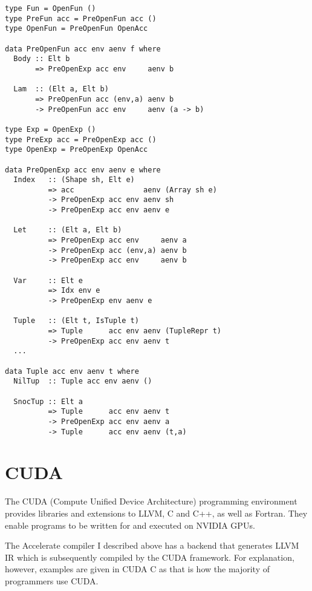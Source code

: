 \begin{lstlisting}[label=lst:exp-ast, caption={The first-order abstract syntax of the \texttt{Exp} level of Accelerate.}]
type Fun = OpenFun ()
type PreFun acc = PreOpenFun acc ()
type OpenFun = PreOpenFun OpenAcc

data PreOpenFun acc env aenv f where
  Body :: Elt b
       => PreOpenExp acc env     aenv b

  Lam  :: (Elt a, Elt b)
       => PreOpenFun acc (env,a) aenv b
       -> PreOpenFun acc env     aenv (a -> b)

type Exp = OpenExp ()
type PreExp acc = PreOpenExp acc ()
type OpenExp = PreOpenExp OpenAcc

data PreOpenExp acc env aenv e where
  Index   :: (Shape sh, Elt e)
          => acc                aenv (Array sh e)
          -> PreOpenExp acc env aenv sh
          -> PreOpenExp acc env aenv e

  Let     :: (Elt a, Elt b)
          => PreOpenExp acc env     aenv a
          -> PreOpenExp acc (env,a) aenv b
          -> PreOpenExp acc env     aenv b

  Var     :: Elt e
          => Idx env e
          -> PreOpenExp env aenv e

  Tuple   :: (Elt t, IsTuple t)
          => Tuple      acc env aenv (TupleRepr t)
          -> PreOpenExp acc env aenv t
  ...

data Tuple acc env aenv t where
  NilTup  :: Tuple acc env aenv ()

  SnocTup :: Elt a
          => Tuple      acc env aenv t
          -> PreOpenExp acc env aenv a
          -> Tuple      acc env aenv (t,a)
\end{lstlisting}
%

\section{CUDA}
\label{sec:cuda}

The CUDA (Compute Unified Device Architecture)\cite{cuda} programming environment provides libraries and extensions to LLVM, C and C++, as well as Fortran. They enable programs to be written for and executed on NVIDIA GPUs.

The Accelerate compiler I described above has a backend that generates LLVM IR which is subsequently compiled by the CUDA framework. For explanation, however, examples are given in CUDA C as that is how the majority of programmers use CUDA.

